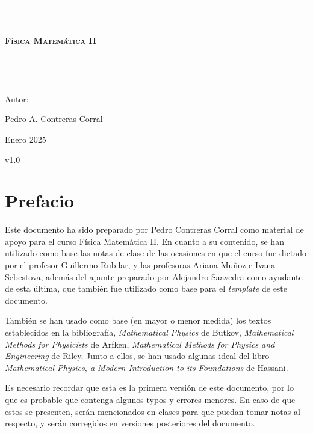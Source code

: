 \documentclass[letterpaper,12pt]{report}
\newlength{\drop}
\theoremstyle{definition}
\begin{document}
\begin{titlepage}
 \textheight
    \centering
    \vspace*{\baselineskip}
    \rule{\textwidth}{1.6pt}\vspace*{-\baselineskip}\vspace*{2pt}
    \rule{\textwidth}{0.4pt}\\[\baselineskip]
    {\scshape\bfseries\Huge{}\selectfont Física Matemática II} \\[0.2\baselineskip]
    \rule{\textwidth}{0.4pt}\vspace*{-\baselineskip}\vspace{3.2pt}
    \rule{\textwidth}{1.6pt}\\[\baselineskip]
    {\Large Autor: \par}
{\large Pedro A. Contreras-Corral \par}
\vfill
{\large Enero 2025 \par}
{\large v1.0 \par}
\end{titlepage}

\chapter*{Prefacio}

Este documento ha sido preparado por Pedro Contreras Corral como material de apoyo para el curso Física Matemática II. En cuanto a su contenido, se han utilizado como base las notas de clase de las ocasiones en que el curso fue dictado por el profesor Guillermo Rubilar, y las profesoras Ariana Muñoz e Ivana Sebestova, además del apunte preparado por Alejandro Saavedra como ayudante de esta última, que también fue utilizado como base para el \emph{template} de este documento.

También se han usado como base (en mayor o menor medida) los textos establecidos en la bibliografía, \emph{Mathematical Physics} de Butkov, \emph{Mathematical Methods for Physicists} de Arfken, \emph{Mathematical Methods for Physics and Engineering} de Riley. Junto a ellos, se han usado algunas ideal del libro \emph{Mathematical Physics, a Modern Introduction to its Foundations} de Hassani.

Es necesario recordar que esta es la primera versión de este documento, por lo que es probable que contenga algunos typos y errores menores. En caso de que estos se presenten, serán mencionados en clases para que puedan tomar notas al respecto, y serán corregidos en versiones posteriores del documento.
\end{document}

